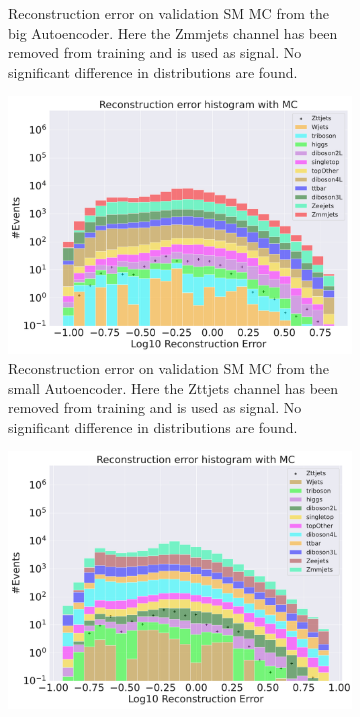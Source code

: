 \begin{figure}[h!]
\begin{subfigure}{.45\textwidth}
        \caption{Reconstruction error on validation SM MC from the big Autoencoder. Here the Zmmjets channel has been removed from training and 
        is used as signal. No significant difference in distributions are found. }
        \label{fig:vae_big_Zmmjets}
    \end{subfigure}
    \hfill
    \begin{subfigure}{.45\textwidth}
        \includegraphics[width=\textwidth]{Figures/VAE_testing/small/b_data_recon_big_rm3_feats_sig_Zttjets.pdf}
        \caption{Reconstruction error on validation SM MC from the small Autoencoder. Here the Zttjets channel has been removed from training and 
        is used as signal. No significant difference in distributions are found. }
        \label{fig:vae_small_Zttjets}
    \end{subfigure}
    \hfill 
    \begin{subfigure}{.45\textwidth}
        \includegraphics[width=\textwidth]{Figures/VAE_testing/big/b_data_recon_big_rm3_feats_sig_Zttjets.pdf}

\end{subfigure}
\end{figure}
